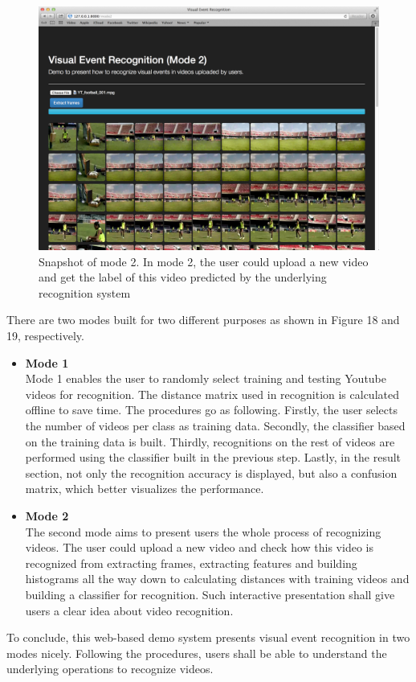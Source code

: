 \begin{figure}[!ht]
\centering
	\includegraphics[scale = 0.2]{./mode2.png}
\caption{Snapshot of mode 2. In mode 2, the user could upload a new video and get the label of this video predicted by the underlying recognition system}
\end{figure}

\noindent There are two modes built for two different purposes as shown in Figure 18 and 19, respectively. 
\begin{itemize}
	\item{\bf Mode 1} \\
	Mode 1 enables the user to randomly select training and testing Youtube videos for recognition. The distance matrix used in recognition is calculated offline to save time. The procedures go as following. Firstly, the user selects the number of videos per class as training data. Secondly, the classifier based on the training data is built. Thirdly, recognitions on the rest of videos are performed using the classifier built in the previous step. Lastly, in the result section, not only the recognition accuracy is displayed, but also a confusion matrix, which better visualizes the performance.   

	\item{\bf Mode 2} \\
	The second mode aims to present users the whole process of recognizing videos. The user could upload a new video and check how this video is recognized from extracting frames, extracting features and building histograms all the way down to calculating distances with training videos and building a classifier for recognition. Such interactive presentation shall give users a clear idea about video recognition.
\end{itemize}

\noindent To conclude, this web-based demo system presents visual event recognition in two modes nicely. Following the procedures, users shall be able to understand the underlying operations to recognize videos. 






